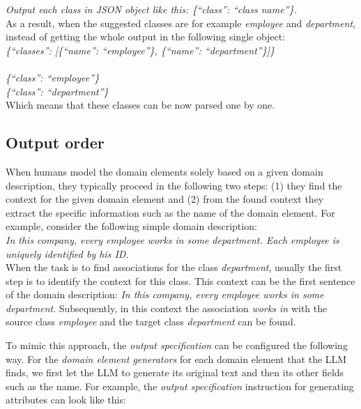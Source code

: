 \noindent{}\textit{Output each class in JSON object like this: \{``class'': ``class name''\}.} \\

\noindent{}As a result, when the suggested classes are for example \textit{employee} and \textit{department}, instead of getting the whole output in the following single object: \\

\noindent{}\textit{\{``classes'': [\{``name'': ``employee''\}, \{``name'': ``department''\}]\}} \\

 \\

\noindent{}\textit{\{``class'': ``employee''\} \\
\{``class'': ``department''\}} \\

\noindent{}Which means that these classes can be now parsed one by one.


\subsection{Output order}
\label{sec:output_order}

When humans model the domain elements solely based on a given domain description, they typically proceed in the following two steps: (1) they find the context for the given domain element and (2) from the found context they extract the specific information such as the name of the domain element. For example, consider the following simple domain description: \\

\noindent{}\textit{In this company, every employee works in some department. Each employee is uniquely identified by his ID.} \\

\noindent{}When the task is to find associations for the class \textit{department}, usually the first step is to identify the context for this class. This context can be the first sentence of the domain description: \textit{In this company, every employee works in some department}. Subsequently, in this context the association \textit{works in} with the source class \textit{employee} and the target class \textit{department} can be found.

To mimic this approach, the \emph{output specification} can be configured the following way. For the \emph{domain element generators} for each domain element that the LLM finds, we first let the LLM to generate its original text and then its other fields such as the name. For example, the \emph{output specification} instruction for generating attributes can look like this: \\

